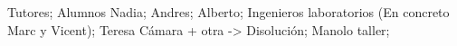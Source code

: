 Tutores;
Alumnos Nadia;
Andres;
Alberto;
Ingenieros laboratorios (En concreto Marc y Vicent);
Teresa Cámara + otra -> Disolución;
Manolo taller;

